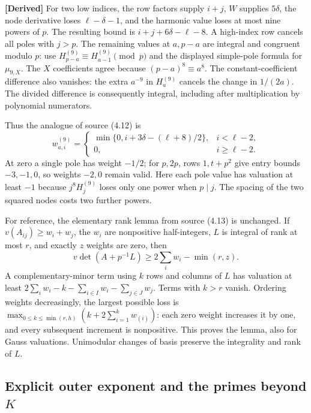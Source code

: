 \textbf{[Derived]}
For two low indices, the row factors supply $i+j$, $W$ supplies
$5\delta$, the node derivative loses $\ell-\delta-1$, and the
harmonic value loses at most nine powers of $p$.  The resulting
bound is $i+j+6\delta-\ell-8$.  A high-index row cancels all
poles with $j>p$.  The remaining values at $a,p-a$ are integral
and congruent modulo $p$: use
$H_{p-a}^{(9)}\equiv H_{a-1}^{(9)}\pmod p$ and the displayed
simple-pole formula for $\mu_{9,X}$.  The $X$ coefficients agree
because $(p-a)^8\equiv a^8$.  The constant-coefficient difference
also vanishes: the extra $a^{-9}$ in $H_a^{(9)}$ cancels the
change in $1/(2a)$.  The divided difference is consequently
integral, including after multiplication by polynomial numerators.

Thus the analogue of source (4.12) is
\begin{equation}
 w^{(9)}_{a,i}=
 \begin{cases}
 \min\{0,i+3\delta-(\ell+8)/2\},&i<\ell-2,\\
 0,&i\geq\ell-2.
 \end{cases}
 \label{s4-outer-weights}
\end{equation}
At zero a single pole has weight $-1/2$; for $p,2p$, rows
$1,t+p^2$ give entry bounds $-3,-1,0$, so weights $-2,0$
remain valid.  Here each pole value has valuation at least $-1$
because $j^8H_j^{(9)}$ loses only one power when $p\mid j$.
The spacing of the two squared nodes costs two further powers.

For reference, the elementary rank lemma from source (4.13)
is unchanged.  If $v(A_{ij})\geq w_i+w_j$, the $w_i$ are
nonpositive half-integers, $L$ is integral of rank at most $r$,
and exactly $z$ weights are zero, then
\begin{equation}
 v\det(A+p^{-1}L)\geq2\sum_iw_i-\min(r,z).
 \label{s4-rank-lemma}
\end{equation}
A complementary-minor term using $k$ rows and columns of $L$
has valuation at least
$2\sum_iw_i-k-\sum_{i\in I}w_i-\sum_{j\in J}w_j$.
Terms with $k>r$ vanish.  Ordering weights decreasingly, the
largest possible loss is
$\max_{0\leq k\leq\min(r,h)}(k+2\sum_{i=1}^kw_{(i)})$:
each zero weight increases it by one, and every subsequent
increment is nonpositive.  This proves the lemma, also for
Gauss valuations.  Unimodular changes of basis preserve the
integrality and rank of $L$.

\subsection{Explicit outer exponent and the primes beyond \texorpdfstring{$K$}{K}}
\label{s4-outer-formula}

